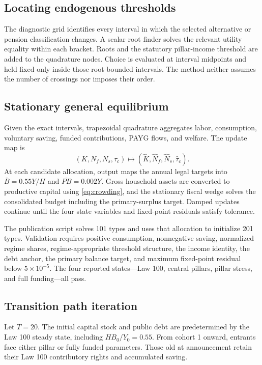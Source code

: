 \documentclass[12pt]{article}
\newcommand{\1}{\mathbf{1}}
\begin{document}
\subsection{Locating endogenous thresholds}

The diagnostic grid identifies every interval in which the selected alternative or pension
classification changes. A scalar root finder solves the relevant utility equality within each
bracket. Roots and the statutory pillar-income threshold are added to the quadrature nodes.
Choice is evaluated at interval midpoints and held fixed only inside those root-bounded
intervals. The method neither assumes the number of crossings nor imposes their order.

\subsection{Stationary general equilibrium}

Given the exact intervals, trapezoidal quadrature aggregates labor, consumption, voluntary
saving, funded contributions, PAYG flows, and welfare. The update map is
\begin{equation}
(K,N_f,N_s,\tau_c)
\longmapsto
(\widehat K,\widehat N_f,\widehat N_s,\widehat\tau_c).
\end{equation}
At each candidate allocation, output maps the annual legal targets into
$\bar B=0.55Y/H$ and $\overline{PB}=0.002Y$. Gross household assets are converted to productive
capital using \eqref{eq:crowding}, and the stationary fiscal wedge solves the consolidated
budget including the primary-surplus target. Damped updates continue until the four state
variables and fixed-point residuals satisfy tolerance.

The publication script solves 101 types and uses that allocation to initialize 201 types.
Validation requires positive consumption, nonnegative saving, normalized regime shares,
regime-appropriate threshold structure, the income identity, the debt anchor, the primary
balance target, and maximum fixed-point residual below $5\times10^{-5}$. The four reported
states---Law 100, central pillars, pillar stress, and full funding---all pass.

\subsection{Transition path iteration}

Let $T=20$. The initial capital stock and public debt are predetermined by the Law 100 steady
state, including $HB_0/Y_0=0.55$. From cohort 1 onward, entrants face either pillar or fully
funded parameters. Those old at announcement retain their Law 100 contributory rights and
accumulated saving.
\end{document}

